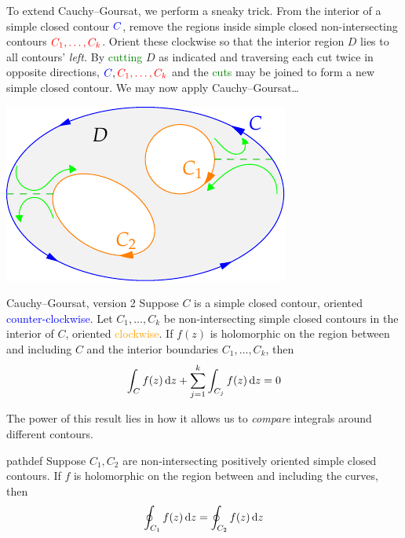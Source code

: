 \begin{minipage}[t]{0.64\linewidth}\vspace{0pt}
	To extend Cauchy--Goursat, we perform a sneaky trick. From the interior of a simple closed contour $\textcolor{blue}{C}$, remove the regions inside simple closed non-intersecting contours $\textcolor{red}{C_1,\ldots,C_k}$. Orient these clockwise so that the interior region $D$ lies to all contours' \emph{left.}\smallbreak
	By \textcolor{Green}{cutting} $D$ as indicated and traversing each cut twice in opposite directions, $\textcolor{blue}{C},\textcolor{red}{C_1,\ldots,C_k}$ and the \textcolor{Green}{cuts} may be joined to form a new simple closed contour. We may now apply Cauchy--Goursat\ldots
\end{minipage}
\hfill
\begin{minipage}[t]{0.35\linewidth}\vspace{0pt}
	\flushright\includegraphics[scale=0.95]{multipleconnected1}
\end{minipage}

\goodbreak



\begin{cor}{Cauchy--Goursat, version 2}{}
	Suppose $C$ is a simple closed contour, oriented \textcolor{blue}{counter-clockwise}. Let $C_1,\ldots,C_k$ be non-intersecting simple closed contours in the interior of $C$, oriented \textcolor{orange}{clockwise}. If $f(z)$ is holomorphic on the region between and including $C$ and the interior boundaries $C_1,\ldots, C_k$, then
	\[
		\int_Cf(z)\,{\mathrm{d} z}+\sum_{j=1}^k\int_{C_j}f(z)\,{\mathrm{d} z}=0
	\]
\end{cor}

The power of this result lies in how it allows us to \emph{compare} integrals around different contours.

\begin{cor}{}{pathdef}
	Suppose $C_1,C_2$ are non-intersecting positively oriented simple closed contours. If $f$ is holomorphic on the region between and including the curves, then
	\[
		\oint_{C_1}f(z)\,{\mathrm{d} z}=\oint_{C_2}f(z)\,{\mathrm{d} z}
	\] 
\end{cor}

